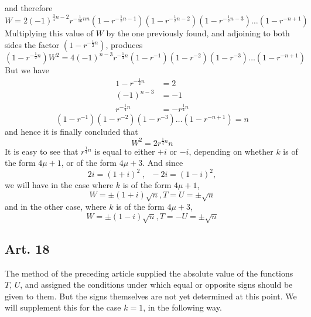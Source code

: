 \documentclass{book}
\theoremstyle{plain}
\theoremstyle{remark}
\begin{document}
and therefore
\[ W = 2 (-1)^{\frac{3}{4} n - 2} r^{-\frac{1}{16} nn } (1-r^{-\frac{1}{2}n-1})(1-r^{-\frac{1}{2}n-2})(1-r^{-\frac{1}{2}n-3})\dots(1-r^{-n+1}) \]
Multiplying this value of $W$ by the one previously found, and adjoining to both sides the factor $(1-r^{-\frac{1}{2} n})$, produces
\[ (1-r^{-\frac{1}{2} n}) W^2 = 4 (-1)^{n-3} r^{-\frac{1}{4} n} (1-r^{-1})(1-r^{-2})(1-r^{-3})\dots(1-r^{-n+1}) \]
But we have
\begin{align*}1-r^{-\frac{1}{2} n} &= 2 \\
(-1)^{n-3} &= -1 \\ 
r^{-\frac{1}{4}n} &= -r^{\frac{1}{4} n} \end{align*}
\[ (1-r^{-1})(1-r^{-2})(1-r^{-3}) \dots (1-r^{-n+1}) = n \]
and hence it is finally concluded that
\begin{equation} W^2 = 2r^{\frac{1}{4} n} n  \end{equation}
It is easy to see that $r^{\frac{1}{4} n}$ is equal to either $+i$ or $-i$, depending on whether $k$ is of the form $4\mu+1$, or of the form $4\mu + 3$.  And since
\[ 2i = (1+i)^2 \; , \; \; -2i = (1-i)^2,\]
we will have in the case where $k$ is of the form $4\mu+1$,
\[ W = \pm (1+i)\sqrt{n} , T=U=\pm \sqrt{n} \]
and in the other case, where $k$ is of the form $4\mu +3$, 
\[ W = \pm (1-i) \sqrt{n}, T= -U = \pm \sqrt{n} \]

\subsection*{ Art. 18 }

The method of the preceding article supplied the absolute value of the functions $T$, $U$, and assigned the conditions under which equal or opposite signs should be given to them.  But the signs themselves are not yet determined at this point.  We will supplement this for the case $k=1$, in the following way. 
\end{document}
